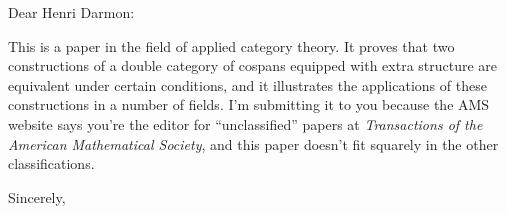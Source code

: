 \documentclass{ucrmath}
\begin{document}
\begin{letter}{}
\opening{Dear Henri Darmon:}

This is a paper in the field of applied category theory.   It proves that two constructions of a double category of cospans equipped with extra structure are equivalent under certain conditions, and it illustrates the applications of these constructions in a number of fields.   I'm submitting it to you because the AMS website says you're the editor for ``unclassified'' papers at \textsl{Transactions of the American Mathematical Society}, and this paper doesn't fit squarely in the other classifications.

\closing{Sincerely,}

\end{letter}
\end{document}
